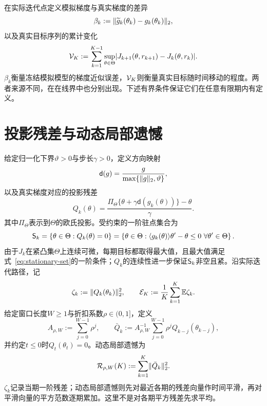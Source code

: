 在实际迭代点定义模拟梯度与真实梯度的差异
\begin{equation}\label{eq:simulator-gradient-error}
 \beta_k
 :=\lVert\widetilde g_k(\theta_k)-g_k(\theta_k)\rVert_2,
\end{equation}
以及真实目标序列的累计变化
\begin{equation}\label{eq:objective-variation}
 \mathcal V_K
 :=\sum_{k=1}^{K-1}
 \sup_{\theta\in\Theta}
 \lvert J_{k+1}(\theta,r_{k+1})-J_k(\theta,r_k)\rvert.
\end{equation}
$\beta_k$衡量冻结模拟模型的梯度近似误差，$\mathcal V_K$则衡量真实目标随时间移动的程度。两者来源不同，在在线界中也分别出现。下述有界条件保证它们在任意有限期内有定义。

\section{投影残差与动态局部遗憾}

给定归一化下界$\vartheta>0$与步长$\gamma>0$，定义方向映射
\begin{equation}\label{eq:normalized-direction}
 \mathsf d(g)=\frac{g}{\max\{\lVert g\rVert_2,\vartheta\}},
\end{equation}
以及真实梯度对应的投影残差
\begin{equation}\label{eq:projected-residual}
 Q_k(\theta)
 =\frac{\Pi_\Theta\{\theta+\gamma\mathsf d(g_k(\theta))\}-\theta}{\gamma}.
\end{equation}
其中$\Pi_\Theta$表示到$\Theta$的欧氏投影。受约束的一阶驻点集合为
\begin{equation}\label{eq:stationary-set}
 \mathsf S_k
 =\{\theta\in\Theta:Q_k(\theta)=0\}
 =\left\{\theta\in\Theta:
 \langle g_k(\theta)\rangle{\theta'-\theta}\le0\ \forall \theta'\in\Theta\right\}.
\end{equation}
由于$J_k$在紧凸集$\Theta$上连续可微，每期目标都取得最大值，且最大值满足式~\eqref{eq:stationary-set}的一阶条件；$Q_k$的连续性进一步保证$\mathsf S_k$非空且紧。沿实际迭代路径，记
\begin{equation}\label{eq:periodwise-residual}
 \zeta_k:=\lVert Q_k(\theta_k)\rVert_2^2,
 \qquad
 \mathcal E_K:=\frac1K\sum_{k=1}^{K}\mathbb E\zeta_k.
\end{equation}
给定窗口长度$W\ge1$与折扣系数$\rho\in(0,1]$，定义
\begin{equation}\label{eq:dynamic-window-residual}
 A_{\rho,W}:=\sum_{j=0}^{W-1}\rho^j,
 \qquad
 \bar Q_k
 :=A_{\rho,W}^{-1}\sum_{j=0}^{W-1}\rho^j Q_{k-j}(\theta_{k-j}),
\end{equation}
并约定$t\le0$时$Q_t(\theta_t)=0$。动态局部遗憾为
\begin{equation}\label{eq:dynamic-regret}
 \mathcal R_{\rho,W}(K):=\sum_{k=1}^{K}\lVert\bar Q_k\rVert_2^2.
\end{equation}
$\zeta_k$记录当期一阶残差；动态局部遗憾则先对最近各期的残差向量作时间平滑，再对平滑向量的平方范数逐期累加。这里不是对各期平方残差先求平均。

